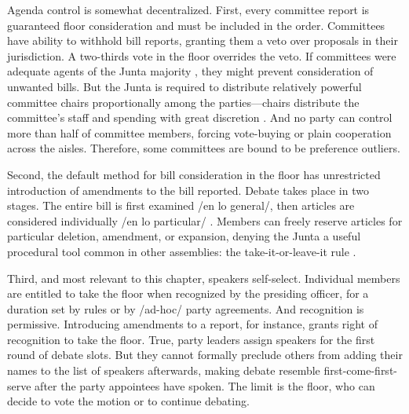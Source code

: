 \documentclass[letter,12pt]{article}
\begin{document}
Agenda control is somewhat decentralized. First, every committee report is guaranteed floor consideration and must be included in the order. Committees have ability to withhold bill reports, granting them a veto over proposals in their jurisdiction. A two-thirds vote in the floor overrides the veto. If committees were adequate agents of the Junta majority \citep[cf.][]{cox.mccubbins.1993}, they might prevent consideration of unwanted bills. But the Junta is required to distribute relatively powerful committee chairs proportionally among the parties---chairs distribute the committee's staff and spending with great discretion \citep{casar.2011}. And no party can control more than half of committee members, forcing vote-buying or plain cooperation across the aisles. Therefore, some committees are bound to be preference outliers.

Second, the default method for bill consideration in the floor has unrestricted introduction of amendments to the bill reported. Debate takes place in two stages. The entire bill is first examined /en lo general/, then articles are considered individually /en lo particular/ \citep[see][]{heller.weldon.2003}. Members can freely reserve articles for particular deletion, amendment, or expansion, denying the Junta a useful procedural tool common in other assemblies: the take-it-or-leave-it rule \citep[eg.,][]{cox.2006,dion.huber.1996}.

Third, and most relevant to this chapter, speakers self-select. Individual members are entitled to take the floor when recognized by the presiding officer, for a duration set by rules or by /ad-hoc/ party agreements. And recognition is permissive. Introducing amendments to a report, for instance, grants right of recognition to take the floor. True, party leaders assign speakers for the first round of debate slots. But they cannot formally preclude others from adding their names to the list of speakers afterwards, making debate resemble first-come-first-serve after the party appointees have spoken. The limit is the floor, who can decide to vote the motion or to continue debating. 

\end{document}
